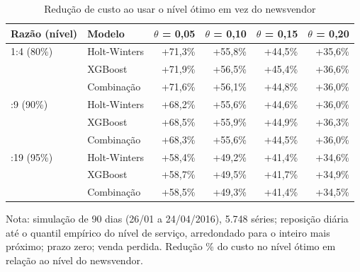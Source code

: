 \begin{table}[htbp]
\centering
\small
\caption{Redução de custo ao usar o nível ótimo em vez do newsvendor}
\label{tab:sim_nivel_otimo_economia}
\begin{tabular}{llrrrr}
\toprule
Razão (nível) & Modelo & $\theta$ = 0,05 & $\theta$ = 0,10 & $\theta$ = 0,15 & $\theta$ = 0,20 \\
\midrule
1:4 (80\%) & Holt-Winters & +71,3\% & +55,8\% & +44,5\% & +35,6\% \\
 & XGBoost & +71,9\% & +56,5\% & +45,4\% & +36,6\% \\
 & Combinação & +71,6\% & +56,1\% & +44,8\% & +36,0\% \\
\addlinespace
1:9 (90\%) & Holt-Winters & +68,2\% & +55,6\% & +44,6\% & +36,0\% \\
 & XGBoost & +68,5\% & +55,9\% & +44,9\% & +36,3\% \\
 & Combinação & +68,3\% & +55,6\% & +44,5\% & +36,0\% \\
\addlinespace
1:19 (95\%) & Holt-Winters & +58,4\% & +49,2\% & +41,4\% & +34,6\% \\
 & XGBoost & +58,7\% & +49,5\% & +41,7\% & +34,9\% \\
 & Combinação & +58,5\% & +49,3\% & +41,4\% & +34,5\% \\
\bottomrule
\end{tabular}
\par\smallskip
{\footnotesize Nota: simulação de 90 dias (26/01 a 24/04/2016), 5.748 séries; reposição diária até o quantil empírico do nível de serviço, arredondado para o inteiro mais próximo; prazo zero; venda perdida. Redução \% do custo no nível ótimo em relação ao nível do newsvendor.}
\end{table}
